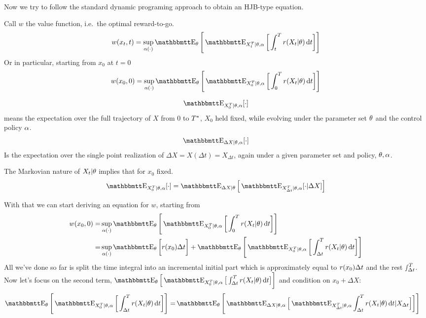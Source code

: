Now we try to follow the standard dynamic programing approach to obtain an
HJB-type equation. 

Call $w$ the value function, i.e.\ the optimal reward-to-go.
\begin{equation}
w(x_t, t) = \sup_{\a(\cdot)} 
\Exp_\th \Bigg[ \Exp_{X_t^T|\th, \a} \bigg[ \int_t^T r(X_t| \th) \intd{t}
\bigg]\Bigg]
\label{eq:value_function_with_prior_defn}
\end{equation}
Or in particular, starting from $x_0$ at $t=0$ 
\begin{equation}
w(x_0, 0) = \sup_{\a(\cdot)} 
\Exp_\th \Bigg[ \Exp_{X_0^T|\th, \a} \bigg[ \int_0^T r(X_t| \th) \intd{t}
\bigg]\Bigg]
\end{equation} 

$$
\Exp_{X_0^T|\th, \a} [\cdot] 
$$
means the expectation over the full trajectory of $X$ from $0$ to ${ T^* }$, $X_0$
held fixed, while evolving under the parameter set ${ \theta}$ and the control
policy $\alpha$.
$$
\Exp_{\Delta X|\th, \a} [\cdot] 
$$
Is the expectation over the single point realization of $\Delta X = X(\Delta t)
= X_{\Delta t}$, again under a given parameter set and policy, ${ \theta}, \alpha$.

The Markovian nature of $X_t|{ \theta}$ implies that for $x_0$ fixed.
$$
\Exp_{X_0^T|\th, \a} [\cdot ] =
\Exp_{\Delta X|\th} \Big[ \Exp_{X_{\Delta t}^T|\th, \a} [ \cdot  | \Delta X ]
\Big] $$

With that we can start deriving an equation for $w$, starting from
\begin{align*}
w(x_0, 0) =& \sup_{\a(\cdot)} 
\Exp_\th \Bigg[ \Exp_{X_0^T|\th, \a} \bigg[ \int_0^T r(X_t| \th) \intd{t}
\bigg] \Bigg]
\\
=&  \sup_{\a(\cdot)} 
\Exp_\th \bigg[ r(x_0) \Delta t \bigg] + 
\Exp_\th \Bigg[ \Exp_{X_0^T|\th, \a} \bigg[ \int_{\Delta t}^T r(X_t| \th)
\intd{t} \bigg] \Bigg]
\end{align*}
All we've done so far is split the time integral into an incremental initial
part which is approximately equal to $r(x_0){ \Delta t }$ and the rest $\smallint_{ \Delta t }^T$.
Now let's focus on the second term, $\Exp_\th \Big[ \Exp_{X_0^T|\th, \a} \big[ \int_{\Delta t}^T r(X_t| \th)
\intd{t} \big] \bigg]$ and condition on $x_0 + \Delta X$:
\begin{align*}
\Exp_\th \Bigg[ \Exp_{X_0^T|\th, \a} \bigg[ \int_{\Delta t}^T r(X_t| \th)
\intd{t} \bigg] \Bigg]
=&  
\Exp_\th \Bigg[ \Exp_{\Delta X |\th, \a} \Big[ \Exp_{X_{\dt}^T|\th, \a}
\int_\dt^T r(X_t| \th) \intd{t} | X_\dt \Big] \bigg] \Bigg]
\end{align*}

